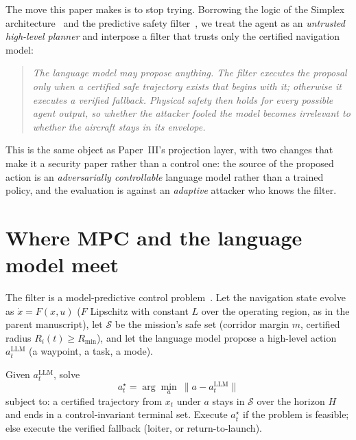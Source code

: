 \documentclass[11pt,a4paper]{article}
\newcommand{\safe}{\mathcal S}
\begin{document}
The move this paper makes is to stop trying. Borrowing the logic of the Simplex
architecture~\cite{seto1998simplex,sha2001simplex} and the predictive safety
filter~\cite{wabersich2021psf,hewing2020mpclearning}, we treat the agent as an
\emph{untrusted high-level planner} and interpose a filter that trusts only the
certified navigation model:

\begin{quote}\itshape
The language model may propose anything. The filter executes the proposal only
when a certified safe trajectory exists that begins with it; otherwise it
executes a verified fallback. Physical safety then holds for every possible
agent output, so whether the attacker fooled the model becomes irrelevant to
whether the aircraft stays in its envelope.
\end{quote}

\noindent
This is the same object as Paper~III's projection layer, with two changes that
make it a security paper rather than a control one: the source of the proposed
action is an \emph{adversarially controllable} language model rather than a
trained policy, and the evaluation is against an \emph{adaptive} attacker who
knows the filter.

\section{Where MPC and the language model meet}
The filter is a model-predictive control
problem~\cite{rawlings2017mpc}. Let the navigation state evolve as
$\dot x=F(x,u)$ ($F$ Lipschitz with constant $L$ over the operating region, as
in the parent manuscript), let $\safe$ be the mission's safe set (corridor
margin $m$, certified radius $R_i(t)\ge R_{\min}$), and let the language model
propose a high-level action $a_t^{\mathrm{LLM}}$ (a waypoint, a task, a mode).

\begin{definition}
Given $a_t^{\mathrm{LLM}}$, solve
\[
a_t^{\star}=\arg\min_{a}\ \|a-a_t^{\mathrm{LLM}}\|
\]
subject to: a certified trajectory from $x_t$ under $a$ stays in $\safe$ over the
horizon $H$ and ends in a control-invariant terminal set. Execute $a_t^{\star}$
if the problem is feasible; else execute the verified fallback (loiter, or
return-to-launch).
\end{definition}
\end{document}
